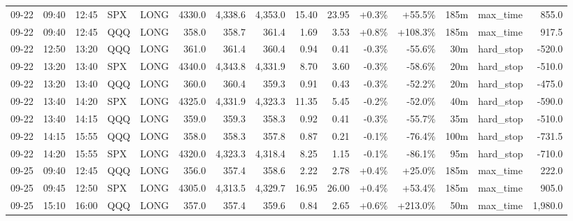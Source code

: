 \documentclass[11pt,a4paper,twoside]{article}
\begin{document}
\begin{landscape}
\begin{center}
\begin{longtable}{>{\color{txtmain}}l l l l l r r r r r r r r >{\color{txtmain}}l r}
09-22 & 09:40 & 12:45 & SPX & LONG & 4330.0 & 4,338.6 & 4,353.0 & 15.40 & 23.95 & \textcolor{wingreen}{+0.3\%} & \textcolor{wingreen}{+55.5\%} & 185m & max\_time & \textcolor{wingreen}{855.0} \\
09-22 & 09:40 & 12:45 & QQQ & LONG & 358.0 & 358.7 & 361.4 & 1.69 & 3.53 & \textcolor{wingreen}{+0.8\%} & \textcolor{wingreen}{+108.3\%} & 185m & max\_time & \textcolor{wingreen}{917.5} \\
09-22 & 12:50 & 13:20 & QQQ & LONG & 361.0 & 361.4 & 360.4 & 0.94 & 0.41 & \textcolor{lossred}{-0.3\%} & \textcolor{lossred}{-55.6\%} & 30m & hard\_stop & \textcolor{lossred}{-520.0} \\
09-22 & 13:20 & 13:40 & SPX & LONG & 4340.0 & 4,343.8 & 4,331.9 & 8.70 & 3.60 & \textcolor{lossred}{-0.3\%} & \textcolor{lossred}{-58.6\%} & 20m & hard\_stop & \textcolor{lossred}{-510.0} \\
09-22 & 13:20 & 13:40 & QQQ & LONG & 360.0 & 360.4 & 359.3 & 0.91 & 0.43 & \textcolor{lossred}{-0.3\%} & \textcolor{lossred}{-52.2\%} & 20m & hard\_stop & \textcolor{lossred}{-475.0} \\
09-22 & 13:40 & 14:20 & SPX & LONG & 4325.0 & 4,331.9 & 4,323.3 & 11.35 & 5.45 & \textcolor{lossred}{-0.2\%} & \textcolor{lossred}{-52.0\%} & 40m & hard\_stop & \textcolor{lossred}{-590.0} \\
09-22 & 13:40 & 14:15 & QQQ & LONG & 359.0 & 359.3 & 358.3 & 0.92 & 0.41 & \textcolor{lossred}{-0.3\%} & \textcolor{lossred}{-55.7\%} & 35m & hard\_stop & \textcolor{lossred}{-510.0} \\
09-22 & 14:15 & 15:55 & QQQ & LONG & 358.0 & 358.3 & 357.8 & 0.87 & 0.21 & \textcolor{lossred}{-0.1\%} & \textcolor{lossred}{-76.4\%} & 100m & hard\_stop & \textcolor{lossred}{-731.5} \\
09-22 & 14:20 & 15:55 & SPX & LONG & 4320.0 & 4,323.3 & 4,318.4 & 8.25 & 1.15 & \textcolor{lossred}{-0.1\%} & \textcolor{lossred}{-86.1\%} & 95m & hard\_stop & \textcolor{lossred}{-710.0} \\
09-25 & 09:40 & 12:45 & QQQ & LONG & 356.0 & 357.4 & 358.6 & 2.22 & 2.78 & \textcolor{wingreen}{+0.4\%} & \textcolor{wingreen}{+25.0\%} & 185m & max\_time & \textcolor{wingreen}{222.0} \\
09-25 & 09:45 & 12:50 & SPX & LONG & 4305.0 & 4,313.5 & 4,329.7 & 16.95 & 26.00 & \textcolor{wingreen}{+0.4\%} & \textcolor{wingreen}{+53.4\%} & 185m & max\_time & \textcolor{wingreen}{905.0} \\
09-25 & 15:10 & 16:00 & QQQ & LONG & 357.0 & 357.4 & 359.6 & 0.84 & 2.65 & \textcolor{wingreen}{+0.6\%} & \textcolor{wingreen}{+213.0\%} & 50m & max\_time & \textcolor{wingreen}{1,980.0} \\

\end{longtable}
\end{center}
\end{landscape}
\end{document}
